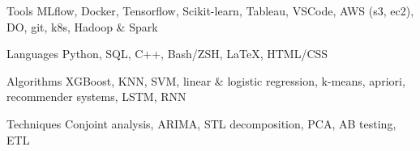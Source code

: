 

\begin{cvskills}

  \cvskill
    {Tools} %
    {MLflow, Docker, Tensorflow, Scikit-learn, Tableau, VSCode, AWS (s3, ec2), DO, git, k8s, Hadoop \& Spark} %

  \cvskill
    {Languages} %
    {Python, SQL, C++, Bash/ZSH, {\LaTeX{}}, HTML/CSS} %

  \cvskill
    {Algorithms} %
    {XGBoost, KNN, SVM, linear \& logistic regression, k-means, apriori, recommender systems, LSTM, RNN} %

  \cvskill
    {Techniques} %
    {Conjoint analysis, ARIMA, STL decomposition, PCA, AB testing, ETL} %

\end{cvskills}
